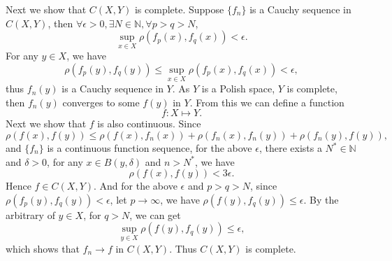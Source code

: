 \documentclass[12pt,a4paper]{ctexart}
\begin{document}
Next we show that $C(X, Y)$ is complete. Suppose $\{f_{n}\}$ is a Cauchy sequence in $C(X, Y)$, then $\forall \epsilon > 0, \exists N \in \mathbb{N}, \forall p > q > N$,
\begin{equation*}
    \sup_{x \in X} \rho(f_{p}(x), f_{q} (x) ) < \epsilon.
\end{equation*}
For any $y \in X$, we have
\begin{equation*}
    \rho(f_{p}(y), f_{q} (y)) \leq \sup_{x \in X} \rho(f_{p}(x), f_{q} (x)) < \epsilon,
\end{equation*}
thus $f_{n}(y)$ is a Cauchy sequence in $Y$. As $Y$ is a Polish space, $Y$ is complete, then $f_{n}(y)$ converges to some $f(y)$ in $Y$. From this we can define a function
\begin{equation*}
    f: X \mapsto Y.
\end{equation*}
Next we show that $f$ is also continuous. Since
\begin{equation*}
    \rho(f(x), f(y)) \leq \rho(f(x), f_{n}(x)) + \rho(f_{n}(x) , f_{n}(y)) + \rho(f_{n}(y), f(y)),
\end{equation*}
and $\{f_{n}\}$ is a continuous function sequence, for the above $\epsilon$, there exists a $N^{*} \in \mathbb{N}$ and $\delta > 0$, for any $x \in B(y, \delta)$ and $n > N^{*}$, we have
\begin{equation*}
    \rho(f(x), f(y)) < 3 \epsilon.
\end{equation*}
Hence $f \in C(X, Y)$. And for the above $\epsilon$ and $p > q > N$, since $\rho(f_{p}(y), f_{q} (y)) < \epsilon$, let $p \to \infty$, we have $\rho(f(y), f_{q}(y)) \leq \epsilon$. By the arbitrary of $y \in X$, for $q > N$, we can get
\begin{equation*}
    \sup_{y \in X} \rho(f(y), f_{q}(y)) \leq \epsilon,
\end{equation*}
which shows that $f_{n} \to f$ in $C(X, Y)$. Thus $C(X, Y)$ is complete.
\end{document}
